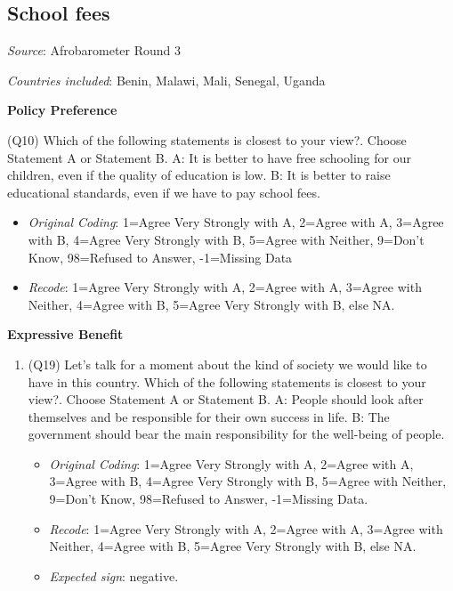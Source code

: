 \documentclass[]{article}
\begin{document}
\subsection{School fees}\label{school-fees}

\textit{Source}: Afrobarometer Round 3

\textit{Countries included}: Benin, Malawi, Mali, Senegal, Uganda

\textbf{Policy Preference}

(Q10) Which of the following statements is closest to your view?. Choose
Statement A or Statement B. A: It is better to have free schooling for
our children, even if the quality of education is low. B: It is better
to raise educational standards, even if we have to pay school fees.

\begin{itemize}

\item \textit{Original Coding}: 1=Agree Very Strongly with A, 2=Agree with A, 3=Agree with B, 4=Agree Very Strongly with B, 5=Agree with Neither, 9=Don’t Know, 98=Refused to Answer, -1=Missing Data

\item \textit{Recode}: 1=Agree Very Strongly with A, 2=Agree with A, 3=Agree with Neither, 4=Agree with B, 5=Agree Very Strongly with B, else NA.

\end{itemize}

\textbf{Expressive Benefit}

\begin{enumerate}
  \item (Q19) Let’s talk for a moment about the kind of society we would like to have in this country. Which of the following statements is closest to your view?. Choose Statement A or Statement B. A: People should look after themselves and be responsible for their own success in life. B: The government should bear the main responsibility for the well-being of people. 
  \begin{itemize}
  \item \textit{Original Coding}: 1=Agree Very Strongly with A, 2=Agree with A, 3=Agree with B, 4=Agree Very Strongly with B, 5=Agree with Neither, 9=Don’t Know, 98=Refused to Answer, -1=Missing Data. 
  \item \textit{Recode}: 1=Agree Very Strongly with A, 2=Agree with A, 3=Agree with Neither, 4=Agree with B, 5=Agree Very Strongly with B, else NA.
  \item \textit{Expected sign}: negative.
  \end{itemize}
\end{enumerate}
\end{document}
